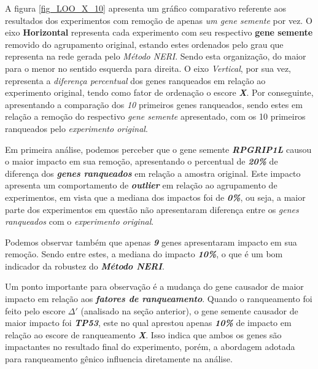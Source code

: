 %
A figura \ref{fig_LOO_X_10} apresenta um gráfico comparativo referente aos resultados dos experimentos com remoção de apenas \textsl{um gene semente} por vez. O eixo \textbf{Horizontal} representa cada experimento com seu respectivo \textbf{gene semente} removido do agrupamento original, estando estes ordenados  pelo grau que representa na rede gerada pelo \textsl{Método NERI}. Sendo esta organização, do maior para o menor no sentido esquerda para direita. O eixo \textsl{Vertical}, por sua vez, representa a \textsl{diferença percentual} dos genes ranqueados em relação ao experimento original, tendo como fator de ordenação o escore \textsl{\textbf{X}}. Por conseguinte, apresentando a comparação dos \textsl{10} primeiros genes ranqueados, sendo estes em relação a remoção do respectivo \textsl{gene semente} apresentado, com os 10 primeiros ranqueados pelo \textsl{experimento original}.
%

Em primeira análise, podemos perceber que o gene semente \textbf{\textsl{RPGRIP1L}} causou o maior impacto em sua remoção, apresentando o percentual de \textsl{\textbf{20\%}} de diferença dos \textsl{\textbf{genes ranqueados}} em relação a amostra original. Este impacto apresenta um comportamento de \textsl{\textbf{outlier}} em relação ao agrupamento de experimentos, em vista que a mediana dos impactos foi de \textsl{\textbf{0\%}}, ou seja, a maior parte dos experimentos em questão não apresentaram diferença entre os \textsl{genes ranqueados} com o \textsl{experimento original}.
%

Podemos observar também que apenas \textsl{\textbf{9}} genes apresentaram impacto em sua remoção. Sendo entre estes, a mediana do impacto \textsl{\textbf{10\%}}, o que é um bom indicador da robustez do \textsl{\textbf{Método NERI}}.
%

Um ponto importante para observação é a mudança do gene causador de maior impacto em relação aos \textsl{\textbf{fatores de ranqueamento}}. Quando o ranqueamento foi feito pelo escore \textsl{\textbf{$\Delta'$}} (analisado na seção anterior), o gene semente causador de maior impacto foi \textsl{\textbf{TP53}}, este no qual aprestou apenas \textsl{\textbf{10\%}} de impacto em relação ao escore de ranqueamento \textsl{\textbf{X}}. Isso indica que ambos os genes são impactantes no resultado final do experimento, porém, a abordagem adotada para ranqueamento gênico influencia diretamente na análise.
%


